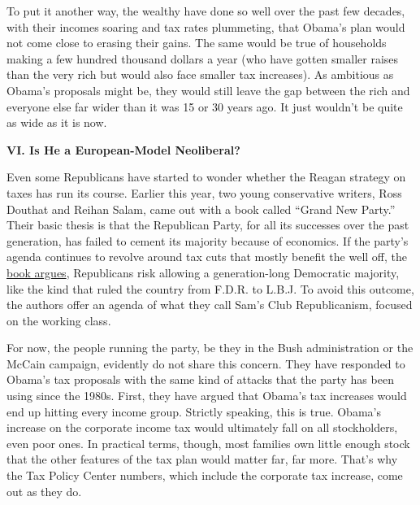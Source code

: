 To put it another way, the wealthy have done so well over the past few
decades, with their incomes soaring and tax rates plummeting, that
Obama's plan would not come close to erasing their gains. The same would
be true of households making a few hundred thousand dollars a year (who
have gotten smaller raises than the very rich but would also face
smaller tax increases). As ambitious as Obama's proposals might be, they
would still leave the gap between the rich and everyone else far wider
than it was 15 or 30 years ago. It just wouldn't be quite as wide as it
is now.

\textbf{VI. Is He a European-Model Neoliberal?}

Even some Republicans have started to wonder whether the Reagan strategy
on taxes has run its course. Earlier this year, two young conservative
writers, Ross Douthat and Reihan Salam, came out with a book called
``Grand New Party.'' Their basic thesis is that the Republican Party,
for all its successes over the past generation, has failed to cement its
majority because of economics. If the party's agenda continues to
revolve around tax cuts that mostly benefit the well off, the
\href{http://www.nytimes3xbfgragh.onion/2008/06/29/books/review/Ornstein-t.html}{book
argues}, Republicans risk allowing a generation-long Democratic
majority, like the kind that ruled the country from F.D.R. to L.B.J. To
avoid this outcome, the authors offer an agenda of what they call Sam's
Club Republicanism, focused on the working class.

For now, the people running the party, be they in the Bush
administration or the McCain campaign, evidently do not share this
concern. They have responded to Obama's tax proposals with the same kind
of attacks that the party has been using since the 1980s. First, they
have argued that Obama's tax increases would end up hitting every income
group. Strictly speaking, this is true. Obama's increase on the
corporate income tax would ultimately fall on all stockholders, even
poor ones. In practical terms, though, most families own little enough
stock that the other features of the tax plan would matter far, far
more. That's why the Tax Policy Center numbers, which include the
corporate tax increase, come out as they do.

